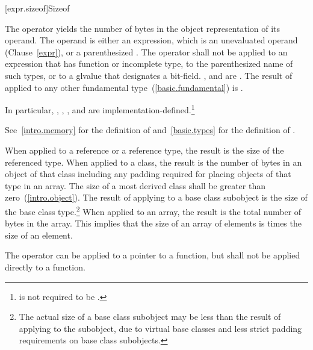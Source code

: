 [expr.sizeof]{Sizeof}

\pnum
{}%
%
%
The  operator yields the number of bytes in the object
representation of its operand. The operand is either an expression,
which is an unevaluated operand (Clause~\ref{expr}), or a parenthesized
.
%
The  operator shall not be applied to an expression that
has function or incomplete type, 
to the parenthesized name of such
types, or to a glvalue that designates a bit-field.
,  and
 are . The result of
 applied to any other fundamental
type~(\ref{basic.fundamental}) is .
\begin{note}
In particular, , ,
, and  are
implementation-defined.\footnote{ is not required to be .}
\end{note}
\begin{note}
See~\ref{intro.memory} for the definition of 
and~\ref{basic.types} for the definition of .
\end{note}

\pnum
{}%
When applied to a reference or a reference type, the result is the size
of the referenced type.
%
When applied to a class, the result is the number of bytes in an object
of that class including any padding required for placing objects of that
type in an array. The size of a most derived class shall be greater than
zero~(\ref{intro.object}). The result of applying  to a
base class subobject is the size of the base class type.\footnote{The actual
size of a base class subobject may be less than the result of
applying  to the subobject, due to virtual base classes
and less strict padding requirements on base class subobjects.}
%
When applied to an array, the result is the total number of bytes in the
array. This implies that the size of an array of  elements is
 times the size of an element.

\pnum
The  operator can be applied to a pointer to a function,
but shall not be applied directly to a function.

